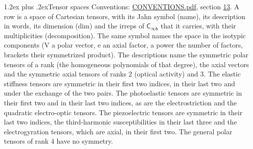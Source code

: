 \documentclass[10pt,a4paper]{article}
\makeatletter
\renewcommand\section{\@startsection{section}{1}{\z@}{-3ex plus -1ex minus -.2ex}%
  {1.2ex plus .2ex}{\normalfont\large\sffamily\bfseries\color{parttitle}}}
\numberwithin{equation}{section}
\newcommand{\grp}[1]{\mathsf{#1}}
\makeatother
\begin{document}
\section{Tensor spaces}\label{s:tensor_spaces}
Conventions: \href{../../CONVENTIONS.pdf}{CONVENTIONS.pdf}, section \href{../../CONVENTIONS.pdf\#conv.13}{13}.
\leavevmode\label{n:head.name}\label{n:head.description}\label{n:head.dim}\label{n:head.decomposition}A row is a space of Cartesian tensors, with its Jahn symbol (name), its description in words, its dimension (dim) and the irreps of $\grp{C_{\infty h}}$ that it carries, with their multiplicities (decomposition). \label{n:label.jahn}The same symbol names the space in the isotypic components (V a polar vector, e an axial factor, a power the number of factors, brackets their symmetrized product). The descriptions name the symmetric polar tensors of a rank (the homogeneous polynomials of that degree), the axial vectors and the symmetric axial tensors of ranks 2 (optical activity) and 3. The elastic stiffness tensors are symmetric in their first two indices, in their last two and under the exchange of the two pairs. The photoelastic tensors are symmetric in their first two and in their last two indices, as are the electrostriction and the quadratic electro-optic tensors. The piezoelectric tensors are symmetric in their last two indices, the third-harmonic susceptibilities in their last three and the electrogyration tensors, which are axial, in their first two. The general polar tensors of rank 4 have no symmetry.
\end{document}
